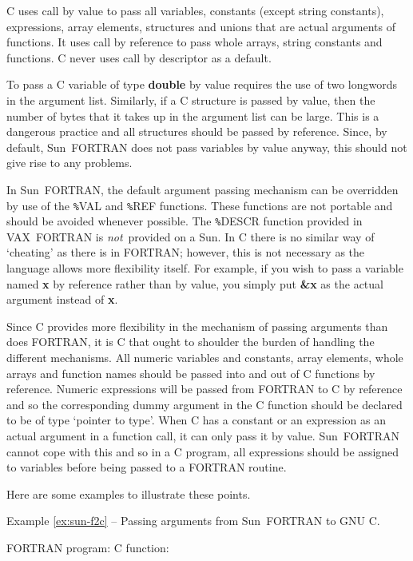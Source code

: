 C uses call by value to pass all variables, constants (except string
constants), expressions, array elements, structures and unions that are actual
arguments of functions. It uses call by reference to pass whole arrays, string
constants and functions. C never uses call by descriptor as a default.

To pass a C variable of type {\bf double} by value requires the use of two
longwords in the argument list. Similarly, if a C structure is passed by value,
then the number of bytes that it takes up in the argument list can be large.
This is a dangerous practice and all structures should be passed by reference.
Since, by default, Sun~FORTRAN does not pass variables by value anyway, this should
not give rise to any problems.

In Sun~FORTRAN, the default argument passing mechanism can be overridden by use
of the {\tt \%}VAL and {\tt \%}REF functions. These functions are not portable
and should be avoided whenever possible. The {\tt \%}DESCR function provided in
VAX~FORTRAN is {\em not}\, provided on a Sun. In C there is no similar way of
`cheating' as there is in FORTRAN; however, this is not necessary as the
language allows more flexibility itself. For example, if you wish to pass a
variable named {\bf x} by reference rather than by value, you simply put {\bf
\&x} as the actual argument instead of {\bf x}. 

Since C provides more flexibility in the mechanism of passing arguments than
does FORTRAN, it is C that ought to shoulder the burden of handling the
different mechanisms. All numeric variables and constants, array elements,
whole arrays and function names should be passed into and out of C functions by
reference. Numeric expressions will be passed from FORTRAN to C by reference
and so the corresponding dummy argument in the C function should be declared to
be of type `pointer to type'. When C has a constant or an expression as an
actual argument in a function call, it can only pass it by value. Sun~FORTRAN
cannot cope with this and so in a C program, all expressions should be assigned
to variables before being passed to a FORTRAN routine.

Here are some examples to illustrate these points. 

\label{ex:sun-f2c}
\begin{center}
Example \ref{ex:sun-f2c} -- Passing arguments from Sun~FORTRAN to GNU C.
\end{center}
\nopagebreak[4]
FORTRAN program:
\pagebreak[1]
C function:

